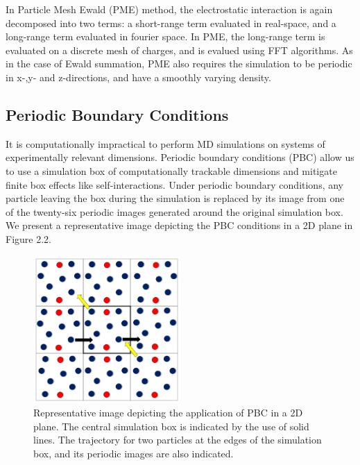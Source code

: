     In Particle Mesh Ewald (PME) method, the electrostatic interaction is again decomposed into two terms: a short-range term evaluated in real-space, and a long-range term evaluated in fourier space. In PME, the long-range term is evaluated on a discrete mesh of charges, and is evalued using FFT algorithms. As in the case of Ewald summation, PME also requires the simulation to be periodic in x-,y- and z-directions, and have a smoothly varying density.
    
    \subsection{Periodic Boundary Conditions}
    It is computationally impractical to perform MD simulations on systems of experimentally relevant dimensions. Periodic boundary conditions (PBC) allow us to use a simulation box of computationally trackable dimensions and mitigate finite box effects like self-interactions. Under periodic boundary conditions, any particle leaving the box during the simulation is replaced by its image from one of the twenty-six periodic images generated around the original simulation box. We present a representative image depicting the PBC conditions in a 2D plane in Figure 2.2.

    \begin{figure}[!h]
        \centering
        \includegraphics[width=0.5\textwidth]{Methods/Figures/pbc.png}
        \caption[Representative image depicting the application of PBC in a 2D plane]{Representative image depicting the application of PBC in a 2D plane. The central simulation box is indicated by the use of solid lines. The trajectory for two particles at the edges of the simulation box, and its periodic images are also indicated.}
    \end{figure}



